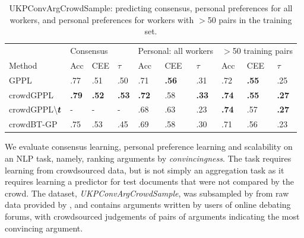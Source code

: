 \begin{table}
 \centering
 \small
 \setlength{\tabcolsep}{4pt}
\begin{tabular}{ l l l l@{\hskip 1.0cm} l l l@{\hskip 1.0cm} l l l}
\hline
 & \multicolumn{3}{l}{Consensus} & 
 \multicolumn{3}{l}{Personal: all workers} &\multicolumn{3}{l}{$>$50 training pairs} \\
 Method & Acc & CEE & $\tau$ & Acc & CEE & $\tau$ & Acc & CEE & $\tau$ \\ 
  \midrule
 GPPL  & 
 .77 & .51 & .50 & 
 .71 &  \textbf{.56} & .31 & 
 .72 &  \textbf{.55} & .25 \\ %
 crowdGPPL & 
 \textbf{.79} & \textbf{.52} & \textbf{.53} & 
 \textbf{.72} & .58 & \textbf{.33} & 
 \textbf{.74} & \textbf{.55} & \textbf{.27}  \\ %
 crowdGPPL$\backslash \boldsymbol t$ & - & - & - &
.68 & .63 & .23 & \textbf{.74} & .57 & \textbf{.27} 
 \\
 crowdBT-GP & .75 & .53 & .45 & .69 & .58 & .30 & .71 & .56 & .23
 \\ \bottomrule
\end{tabular}
\caption{UKPConvArgCrowdSample: predicting consensus, personal preferences for all workers,
and personal preferences for workers with $>$50 pairs in the training set.
}
\label{tab:convarg}
\end{table}
We evaluate consensus learning, personal preference learning and scalability
on an NLP task, namely, ranking arguments by \emph{convincingness}. 
The task requires learning from crowdsourced data, but is not simply an aggregation task as it 
requires learning a predictor for test documents that were not compared by the crowd.
The dataset, \emph{UKPConvArgCrowdSample}, was subsampled by \citet{simpson2018finding}
from raw data provided by \citet{habernal2016argument}, and
contains arguments written by users
of online debating forums,
with crowdsourced judgements of pairs of arguments
 indicating the most convincing argument.
